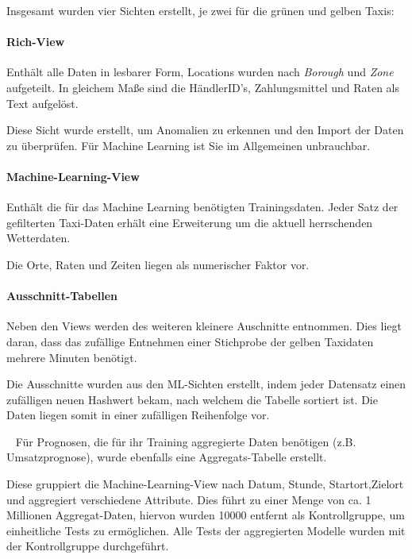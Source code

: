 Insgesamt wurden vier Sichten erstellt, je zwei für die grünen und gelben Taxis:

\paragraph{Rich-View}
Enthält alle Daten in lesbarer Form, Locations wurden nach \textit{Borough} und \textit{Zone} aufgeteilt. In gleichem Maße sind die HändlerID's, Zahlungsmittel und Raten als Text aufgelöst.

Diese Sicht wurde erstellt, um Anomalien zu erkennen und den Import der Daten zu überprüfen. Für Machine Learning ist Sie im Allgemeinen unbrauchbar. 

\paragraph{Machine-Learning-View}
Enthält die für das Machine Learning benötigten Trainingsdaten. Jeder Satz der gefilterten Taxi-Daten erhält eine Erweiterung um die aktuell herrschenden Wetterdaten. 

Die Orte, Raten und Zeiten liegen als numerischer Faktor vor. 

\paragraph{Ausschnitt-Tabellen}
Neben den Views werden des weiteren kleinere Auschnitte entnommen. Dies liegt daran, dass das zufällige Entnehmen einer Stichprobe der gelben Taxidaten mehrere Minuten benötigt. 

Die Ausschnitte wurden aus den ML-Sichten erstellt, indem jeder Datensatz einen zufälligen neuen Hashwert bekam, nach welchem die Tabelle sortiert ist. Die Daten liegen somit in einer zufälligen Reihenfolge vor.

~\newline
Für Prognosen, die für ihr Training aggregierte Daten benötigen (z.B. Umsatzprognose), wurde ebenfalls eine Aggregats-Tabelle erstellt. 

Diese gruppiert die Machine-Learning-View nach Datum, Stunde, Startort,Zielort und aggregiert verschiedene Attribute. Dies führt zu einer Menge von ca. 1 Millionen Aggregat-Daten, hiervon wurden 10000 entfernt als Kontrollgruppe, um einheitliche Tests zu ermöglichen. Alle Tests der aggregierten Modelle wurden mit der Kontrollgruppe durchgeführt.